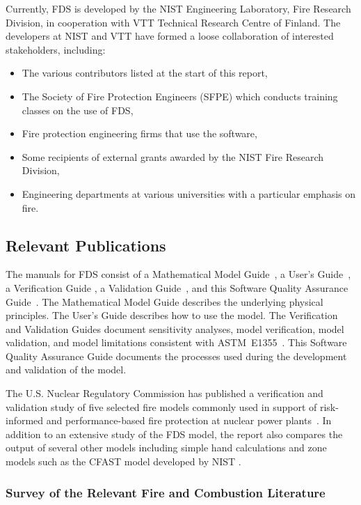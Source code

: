 \documentclass[11pt]{book}
\begin{document}
Currently, FDS is developed by the NIST Engineering Laboratory, Fire Research Division, in cooperation with VTT Technical Research Centre of Finland. The developers at NIST and VTT have formed a loose collaboration of interested stakeholders, including:
\begin{itemize}
\item The various contributors listed at the start of this report,
\item The Society of Fire Protection Engineers (SFPE) which conducts training classes on the use of FDS,
\item Fire protection engineering firms that use the software,
\item Some recipients of external grants awarded by the NIST Fire Research Division,
\item Engineering departments at various universities with a particular emphasis on fire.
\end{itemize}

\subsection{Relevant Publications}

The manuals for FDS consist of a Mathematical Model Guide~\cite{FDS_Math_Guide}, a User's Guide~\cite{FDS_Users_Guide}, a Verification Guide \cite{FDS_Verification_Guide}, a Validation Guide~\cite{CFAST_Valid_Guide_7}, and this Software Quality Assurance Guide~\cite{SQA_Guide}.  The Mathematical Model Guide describes the underlying physical principles. The User's Guide describes how to use the model. The Verification and Validation Guides document sensitivity analyses, model verification, model validation, and model limitations consistent with ASTM~E1355~\cite{ASTM:E1355}. This Software Quality Assurance Guide documents the processes used during the development and validation of the model.

The U.S. Nuclear Regulatory Commission has published a verification and validation study of five selected fire models commonly used in support of risk-informed and performance-based fire protection at nuclear power plants~\cite{NRCNUREG1824}. In addition to an extensive study of the FDS model, the report also compares the output of several other models including simple hand calculations and zone models such as the CFAST model developed by NIST \cite{CFAST_Tech_Guide_7}.

\subsubsection{Survey of the Relevant Fire and Combustion Literature}
\end{document}

